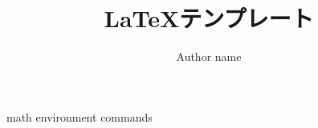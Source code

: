 \documentclass[a4paper,11pt]{ltjreport}
\title{\LaTeX テンプレート}
\author{Author name}
\date{\the\year}
\begin{document}
\maketitle
\tableofcontents

{math}
{environment}
{commands}
\end{document}
